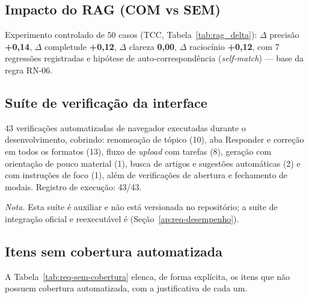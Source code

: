 \subsection{Impacto do RAG (COM vs SEM)}
\label{ap:req-impacto-rag}

Experimento controlado de 50 casos (TCC, Tabela~\ref{tab:rag_delta}): $\Delta$ precisão \textbf{+0,14}, $\Delta$ completude \textbf{+0,12}, $\Delta$ clareza \textbf{0,00}, $\Delta$ raciocínio \textbf{+0,12}, com 7 regressões registradas e hipótese de auto-correspondência (\textit{self-match}) --- base da regra RN-06.

\subsection{Suíte de verificação da interface}
\label{ap:req-suite-interface}

43 verificações automatizadas de navegador executadas durante o desenvolvimento, cobrindo: renomeação de tópico (10), aba Responder e correção em todos os formatos (13), fluxo de \emph{upload} com tarefas (8), geração com orientação de pouco material (1), busca de artigos e sugestões automáticas (2) e \texttt{} com instruções de foco (1), além de verificações de abertura e fechamento de modais. Registro de execução: 43/43.

\noindent\textit{Nota.} Esta suíte é auxiliar e não está versionada no repositório; a suíte de integração oficial e reexecutável é \texttt{} (Seção~\ref{ap:req-desempenho}).

\subsection{Itens sem cobertura automatizada}
\label{ap:req-sem-cobertura}

A Tabela~\ref{tab:req-sem-cobertura} elenca, de forma explícita, os itens que não possuem cobertura automatizada, com a justificativa de cada um.

